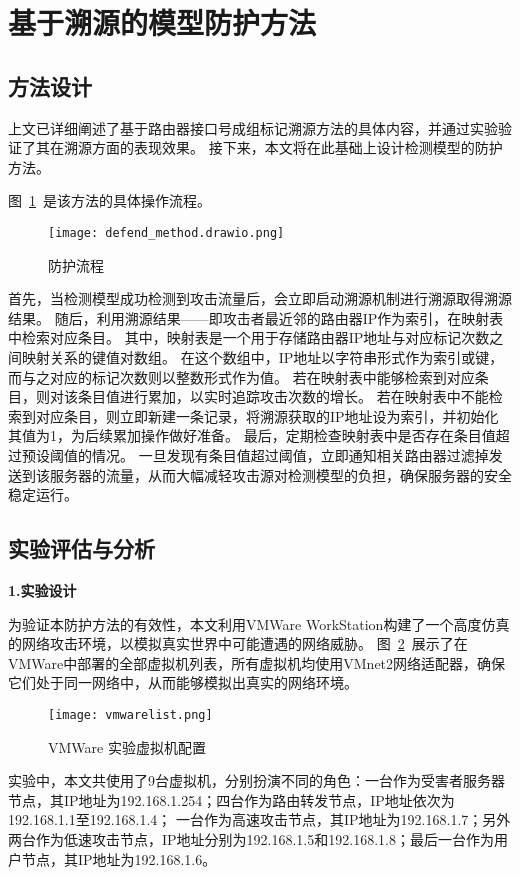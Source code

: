 \section{基于溯源的模型防护方法}
\subsection{方法设计}
上文已详细阐述了基于路由器接口号成组标记溯源方法的具体内容，并通过实验验证了其在溯源方面的表现效果。
接下来，本文将在此基础上设计检测模型的防护方法。\par
图~\ref{fig:defend_procedure}~是该方法的具体操作流程。
\begin{figure}[h]
	\centering
	\texttt{[image: defend\_method.drawio.png]}
	\caption{防护流程}
	\label{fig:defend_procedure}
\end{figure}
首先，当检测模型成功检测到攻击流量后，会立即启动溯源机制进行溯源取得溯源结果。
随后，利用溯源结果——即攻击者最近邻的路由器IP作为索引，在映射表中检索对应条目。
其中，映射表是一个用于存储路由器IP地址与对应标记次数之间映射关系的键值对数组。
在这个数组中，IP地址以字符串形式作为索引或键，而与之对应的标记次数则以整数形式作为值。
若在映射表中能够检索到对应条目，则对该条目值进行累加，以实时追踪攻击次数的增长。
若在映射表中不能检索到对应条目，则立即新建一条记录，将溯源获取的IP地址设为索引，并初始化其值为1，为后续累加操作做好准备。
最后，定期检查映射表中是否存在条目值超过预设阈值的情况。
一旦发现有条目值超过阈值，立即通知相关路由器过滤掉发送到该服务器的流量，从而大幅减轻攻击源对检测模型的负担，确保服务器的安全稳定运行。


\subsection{实验评估与分析}
\textbf{1.实验设计}\par
为验证本防护方法的有效性，本文利用VMWare WorkStation构建了一个高度仿真的网络攻击环境，以模拟真实世界中可能遭遇的网络威胁。
图~\ref{fig:vmwarelist}~展示了在VMWare中部署的全部虚拟机列表，所有虚拟机均使用VMnet2网络适配器，确保它们处于同一网络中，从而能够模拟出真实的网络环境。
\begin{figure}[h]
	\centering
	\texttt{[image: vmwarelist.png]}
	\caption{VMWare 实验虚拟机配置}
	\label{fig:vmwarelist}
\end{figure}
实验中，本文共使用了9台虚拟机，分别扮演不同的角色：一台作为受害者服务器节点，其IP地址为192.168.1.254；四台作为路由转发节点，IP地址依次为192.168.1.1至192.168.1.4；
一台作为高速攻击节点，其IP地址为192.168.1.7；另外两台作为低速攻击节点，IP地址分别为192.168.1.5和192.168.1.8；最后一台作为用户节点，其IP地址为192.168.1.6。\par

